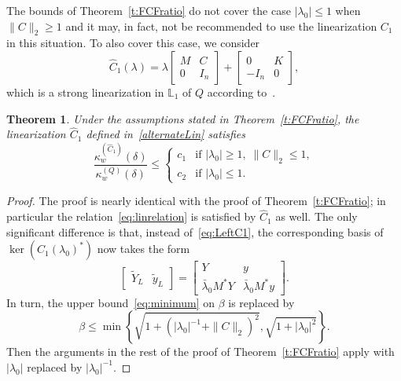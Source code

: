 \documentclass[12pt]{article}
\newtheorem{theorem}{Theorem}[section]
\begin{document}
The bounds of Theorem~\ref{t:FCFratio} do not cover the case $|\lambda_0|\leq 1$ when $\|C\|_2 \geq 1$ and it may, in fact, not be recommended to use the linearization $C_1$ in this situation.  To also cover this case, we consider
\begin{equation}\label{alternateLin}
    \hat{C}_1(\lambda) = \lambda \begin{bmatrix}
        M & C\\
        0 & I_n
    \end{bmatrix} + \begin{bmatrix}
        0 & K\\
        -I_n & 0
    \end{bmatrix},
\end{equation}
which is a strong linearization in $\mathbb L_1$ of $Q$ according to~\cite[Theorem 4.1]{de2009linearizations}. %
\begin{theorem}\label{t:ACFratio}
Under the assumptions stated in Theorem~\ref{t:FCFratio}, the linearization $\hat C_1$ defined in~\eqref{alternateLin} satisfies
\[
        \frac{\kappa^{(\hat C_1)}_w(\delta)}{\kappa^{(Q)}_w(\delta)} \leq \begin{cases}
        c_1 & \text{if } |\lambda_0|\geq 1, \; \|C\|_2 \leq 1, \\
        c_2 & \text{if } |\lambda_0|\leq 1.
        \end{cases}
\]
\end{theorem}
\begin{proof}
The proof is nearly identical with the proof of Theorem~\ref{t:FCFratio}; in particular the relation~\eqref{eq:linrelation} is satisfied by $\hat C_1$ as well. The only significant difference is that, instead of~\eqref{eq:LeftC1}, the corresponding basis of $\ker(C_1(\lambda_0)^*)$ now takes the form
\[
 \begin{bmatrix}
   \tilde Y_L & \tilde y_L
   \end{bmatrix} = 
 \begin{bmatrix} Y & y \\
    \bar \lambda_0 M^* Y  & \bar \lambda_0 M ^* y
\end{bmatrix}.
\]
In turn, the upper bound~\eqref{eq:minimum} on $\beta$ is replaced by
\[
\beta \le \min \left\{ \sqrt{1+(|\lambda_0|^{-1}+\|C\|_2)^2}, \sqrt{1+|\lambda_0|^{2}} \right\}.
\]
Then the arguments in the rest of the proof of Theorem~\ref{t:FCFratio} apply with $|\lambda_0|$ replaced by $|\lambda_0|^{-1}$. \end{proof}
\end{document}
